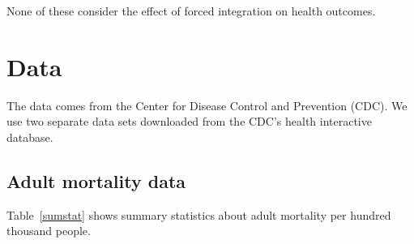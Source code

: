 \documentclass[12pt]{article}
\begin{document}
None of these consider the effect of forced integration on health outcomes.

\section{Data}
The data comes from the Center for Disease Control and Prevention (CDC). We use two separate data sets downloaded from the CDC's health interactive database.

\subsection{Adult mortality data}
Table~\ref{sumstat} shows summary statistics about adult mortality per hundred thousand people.
\end{document}
